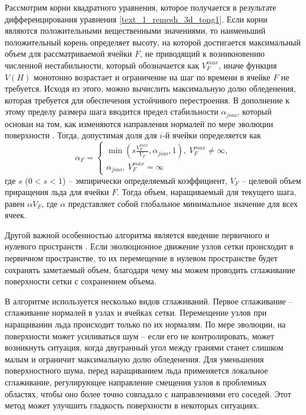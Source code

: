 Рассмотрим корни квадратного уравнения, которое получается в результате дифференцирования уравнения \eqref{text_1_remesh_3d_tong1}.
Если корни являются положительными вещественными значениями, то наименьший положительный корень определяет высоту, на которой достигается максимальный объем для рассматриваемой ячейки $F$, не приводящий к возникновению численной нестабильности, который обозначается как $V_F^{max}$, иначе функция $V(H)$ монотонно возрастает и ограничение на шаг по времени в ячейке $F$ не требуется.
Исходя из этого, можно вычислить максимальную долю обледенения, которая требуется для обеспечения устойчивого перестроения.
В дополнение к этому пределу размера шага вводится предел стабильности $\alpha_{jiao}$, который основан на том, как изменяются направления нормалей по мере эволюции поверхности \cite{Jiao2007Offsetting}.
Тогда, допустимая доля для $i$-й ячейки определяется как
\begin{equation}
\alpha_F =
	\begin{cases}
		\min \left( s \frac{V_F^{max}}{V_F}, \alpha_{jiao}, 1 \right), \ V_F^{max} \ne \infty, \\
		\alpha_{jiao}, \ V_F^{max} = \infty
	\end{cases}
\end{equation}
где $s$ ($0 < s < 1$) -- эмпирически определяемый коэффициент, $V_F$ -- целевой объем приращения льда для ячейки $F$.
Тогда объем, наращиваемый для текущего шага, равен $\alpha V_F$, где $\alpha$ представляет собой глобальное минимальное значение для всех ячеек.

Другой важной особенностью алгоритма является введение первичного и нулевого пространств \cite{Jiao2006Smooth}.
Если эволюционное движение узлов сетки происходит в первичном пространстве, то их перемещение в нулевом пространстве будет сохранять заметаемый объем, благодаря чему мы можем  проводить сглаживание поверхности сетки с сохранением объема.

В алгоритме используется несколько видов сглаживаний.
Первое сглаживание -- сглаживание нормалей в узлах и ячейках сетки.
Перемещение узлов при наращивании льда происходит только по их нормалям.
По мере эволюции, на поверхности может усиливаться шум -- если его не контролировать, может возникнуть ситуация, когда двугранный угол между гранями станет слишком малым и ограничит максимальную долю обледенения.
Для уменьшения поверхностного шума, перед наращиванием льда применяется локальное сглаживание, регулирующее направление смещения узлов в проблемных областях, чтобы оно более точно совпадало с направлениями его соседей.
Этот метод может улучшить гладкость поверхности в некоторых ситуациях.

